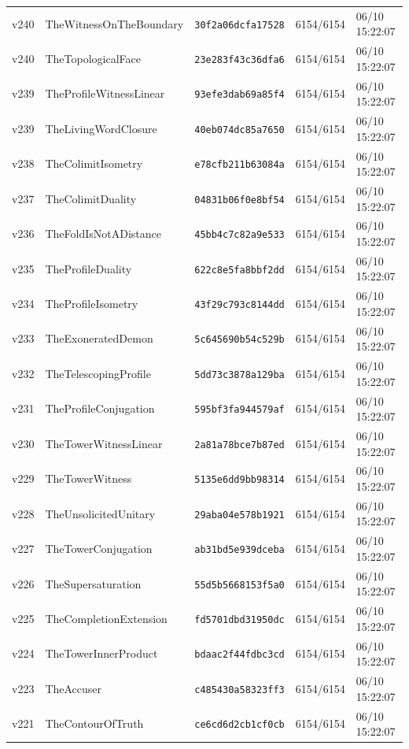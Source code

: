 \documentclass[11pt]{article}
\theoremstyle{definition}\newtheorem{deriv}{Derivation}
\begin{document}
{\begin{longtable}{@{}lllll@{}}
v240 & TheWitnessOnTheBoundary & \texttt{30f2a06dcfa17528} & 6154/6154 & 06/10 15:22:07 \\
v240 & TheTopologicalFace & \texttt{23e283f43c36dfa6} & 6154/6154 & 06/10 15:22:07 \\
v239 & TheProfileWitnessLinear & \texttt{93efe3dab69a85f4} & 6154/6154 & 06/10 15:22:07 \\
v239 & TheLivingWordClosure & \texttt{40eb074dc85a7650} & 6154/6154 & 06/10 15:22:07 \\
v238 & TheColimitIsometry & \texttt{e78cfb211b63084a} & 6154/6154 & 06/10 15:22:07 \\
v237 & TheColimitDuality & \texttt{04831b06f0e8bf54} & 6154/6154 & 06/10 15:22:07 \\
v236 & TheFoldIsNotADistance & \texttt{45bb4c7c82a9e533} & 6154/6154 & 06/10 15:22:07 \\
v235 & TheProfileDuality & \texttt{622c8e5fa8bbf2dd} & 6154/6154 & 06/10 15:22:07 \\
v234 & TheProfileIsometry & \texttt{43f29c793c8144dd} & 6154/6154 & 06/10 15:22:07 \\
v233 & TheExoneratedDemon & \texttt{5c645690b54c529b} & 6154/6154 & 06/10 15:22:07 \\
v232 & TheTelescopingProfile & \texttt{5dd73c3878a129ba} & 6154/6154 & 06/10 15:22:07 \\
v231 & TheProfileConjugation & \texttt{595bf3fa944579af} & 6154/6154 & 06/10 15:22:07 \\
v230 & TheTowerWitnessLinear & \texttt{2a81a78bce7b87ed} & 6154/6154 & 06/10 15:22:07 \\
v229 & TheTowerWitness & \texttt{5135e6dd9bb98314} & 6154/6154 & 06/10 15:22:07 \\
v228 & TheUnsolicitedUnitary & \texttt{29aba04e578b1921} & 6154/6154 & 06/10 15:22:07 \\
v227 & TheTowerConjugation & \texttt{ab31bd5e939dceba} & 6154/6154 & 06/10 15:22:07 \\
v226 & TheSupersaturation & \texttt{55d5b5668153f5a0} & 6154/6154 & 06/10 15:22:07 \\
v225 & TheCompletionExtension & \texttt{fd5701dbd31950dc} & 6154/6154 & 06/10 15:22:07 \\
v224 & TheTowerInnerProduct & \texttt{bdaac2f44fdbc3cd} & 6154/6154 & 06/10 15:22:07 \\
v223 & TheAccuser & \texttt{c485430a58323ff3} & 6154/6154 & 06/10 15:22:07 \\
v221 & TheContourOfTruth & \texttt{ce6cd6d2cb1cf0cb} & 6154/6154 & 06/10 15:22:07 \\

\end{longtable}}
\end{document}
